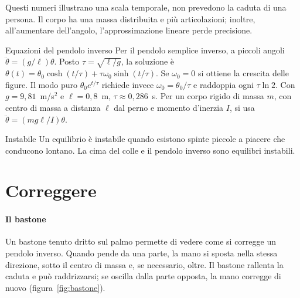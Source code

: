 \documentclass[11pt]{article}
\begin{document}
Questi numeri illustrano una scala temporale, non prevedono la caduta di una persona. Il corpo ha una massa distribuita e più articolazioni; inoltre, all'aumentare dell'angolo, l'approssimazione lineare perde precisione.

\begin{formule}{Equazioni del pendolo inverso}
Per il pendolo semplice inverso, a piccoli angoli $\ddot{\theta}=(g/\ell)\theta$. Posto $\tau=\sqrt{\ell/g}$, la soluzione è $\theta(t)=\theta_0\cosh(t/\tau)+\tau\omega_0\sinh(t/\tau)$. Se $\omega_0=0$ si ottiene la crescita delle figure. Il modo puro $\theta_0e^{t/\tau}$ richiede invece $\omega_0=\theta_0/\tau$ e raddoppia ogni $\tau\ln2$. Con $g=9{,}81$~m/s$^2$ e $\ell=0{,}8$~m, $\tau\approx0{,}286$~s. Per un corpo rigido di massa $m$, con centro di massa a distanza $\ell$ dal perno e momento d'inerzia $I$, si usa $\ddot{\theta}=(mg\ell/I)\theta$.
\end{formule}

\begin{parola}{Instabile}
Un equilibrio è instabile quando esistono spinte piccole a piacere che conducono lontano. La cima del colle e il pendolo inverso sono equilibri instabili.
\end{parola}

\section{Correggere}\label{sec:correggere}

\paragraph{Il bastone} Un bastone tenuto dritto sul palmo permette di vedere come si corregge un pendolo inverso. Quando pende da una parte, la mano si sposta nella stessa direzione, sotto il centro di massa e, se necessario, oltre. Il bastone rallenta la caduta e può raddrizzarsi; se oscilla dalla parte opposta, la mano corregge di nuovo (figura~\ref{fig:bastone}).
\end{document}
